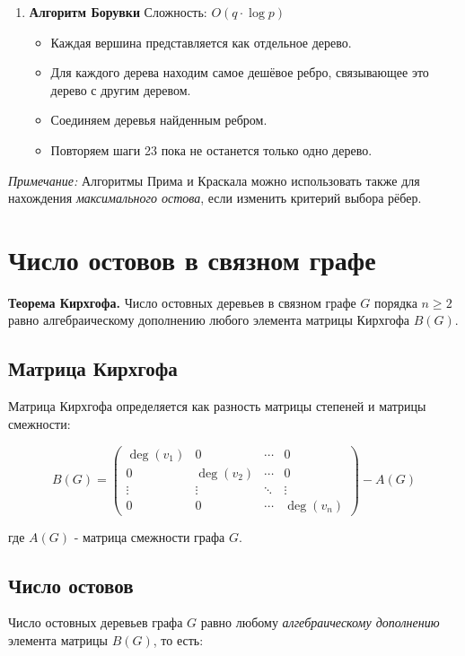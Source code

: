 {\begin{enumerate}
  \item \textbf{Алгоритм Борувки}  
  Сложность: $O(q \cdot \log p)$
  \begin{itemize}
	\item Каждая вершина представляется как отдельное дерево.
	\item Для каждого дерева находим самое дешёвое ребро, связывающее это
дерево с другим деревом.
	\item Соединяем деревья найденным ребром.
	\item Повторяем шаги 23 пока не останется только одно дерево.
  \end{itemize}
\end{enumerate}

\textit{Примечание:} Алгоритмы Прима и Краскала можно использовать также для нахождения \emph{максимального остова}, если изменить критерий выбора рёбер.

\section*{Число остовов в связном графе}

\textbf{Теорема Кирхгофа.}  
Число остовных деревьев в связном графе $G$ порядка $n \ge 2$ равно алгебраическому дополнению любого элемента матрицы Кирхгофа $B(G)$.

\subsection*{Матрица Кирхгофа}

Матрица Кирхгофа определяется как разность матрицы степеней и матрицы смежности:


\[
B(G) = 
\begin{pmatrix}
\deg(v_1) & 0 & \cdots & 0 \\
0 & \deg(v_2) & \cdots & 0 \\
\vdots & \vdots & \ddots & \vdots \\
0 & 0 & \cdots & \deg(v_n)
\end{pmatrix}
- A(G)
\]


где $A(G)$ - матрица смежности графа $G$.

\subsection*{Число остовов}

Число остовных деревьев графа $G$ равно любому \emph{алгебраическому дополнению} элемента матрицы $B(G)$, то есть:


}
